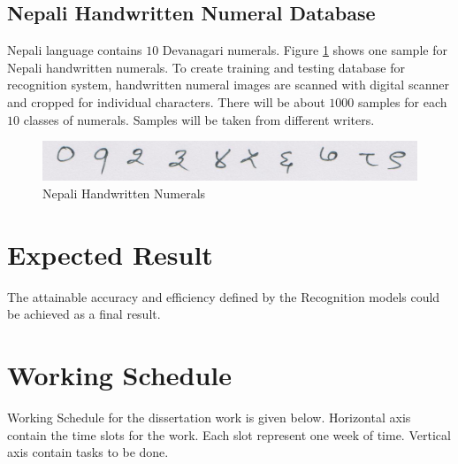 \documentclass[12pt,a4paper,oneside]{article}
\numberwithin{equation}{section}
\numberwithin{algorithm}{section}
\begin{document}
	\subsection{Nepali Handwritten Numeral Database}
	\label{section_numeral_database}
	
	Nepali language contains $10$ Devanagari numerals. Figure \ref{figure_one_two} shows one sample for Nepali handwritten numerals. To create training and testing database for recognition system, handwritten numeral images are scanned with digital scanner and cropped for individual characters. There will be about $1000$ samples for each $10$ classes of numerals. Samples will be taken from different writers.
	\begin{figure}[hbtp]
	\centering
	\includegraphics[width=\linewidth]{figures/one_two}
	\caption{Nepali Handwritten Numerals}
	\label{figure_one_two}
	\end{figure}
	
	\section{Expected Result}\label{expected_result}
	
	The attainable accuracy and efficiency defined by the Recognition models could be achieved as a final result.
	\section{Working Schedule}\label{working_schedule}
	Working Schedule for the dissertation work is given below. Horizontal axis contain the time slots for the work. Each slot represent one week  of time. Vertical axis contain tasks to be done.\par
	
		\centering
			
	
	
	
\end{document}
